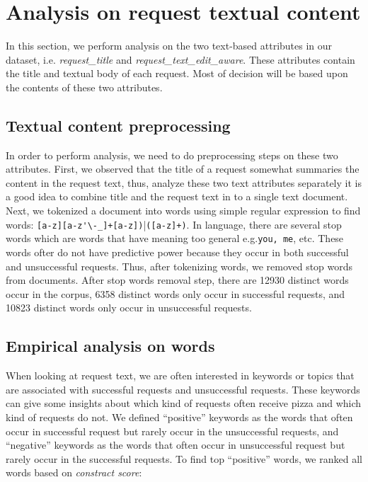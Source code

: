 \section{Analysis on request textual content}
In this section, we perform analysis on the two text-based attributes in our dataset, i.e. \textit{request\_title} and \textit{request\_text\_edit\_aware}. These attributes contain the title and textual body of each request. Most of decision will be based upon the contents of these two attributes.

\subsection{Textual content preprocessing}

In order to perform analysis, we need to do preprocessing steps on these two attributes. First, we observed that the title of a request somewhat summaries the content in the request text, thus, analyze these two text attributes separately it is a good idea to combine title and the request text in to a single text document. Next, we tokenized a document into words using simple regular expression to find words: \verb|[a-z][a-z'\-_]+[a-z])||\verb|([a-z]+)|. In language, there are several stop words which are words that have meaning too general e.g.\texttt{you, me}, etc. These words ofter do not have predictive power because they occur in both successful and unsuccessful requests. Thus, after tokenizing words, we removed stop words from documents. After stop words removal step, there are 12930 distinct words occur in the corpus, 6358 distinct words only occur in successful requests, and 10823 distinct words only occur in unsuccessful requests.     

\subsection{Empirical analysis on words}

When looking at request text, we are often interested in keywords or topics that are associated with successful requests and unsuccessful requests. These keywords can give some insights about which kind of requests often receive pizza and which kind of requests do not. We defined ``positive'' keywords as the words that often occur in successful request but rarely occur in the unsuccessful requests, and ``negative'' keywords as the words that often occur in unsuccessful request but rarely occur in the successful requests. To find top ``positive'' words, we ranked all words based on \textit{constract score}:

